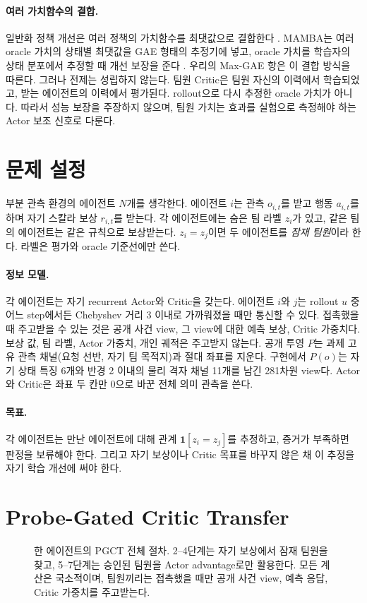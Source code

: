 \documentclass[10pt,twocolumn,letterpaper]{article}
\begin{document}
\paragraph{여러 가치함수의 결합.}
일반화 정책 개선은 여러 정책의 가치함수를 최댓값으로 결합한다 \citep{gpi}. MAMBA는 여러 oracle 가치의 상태별 최댓값을 GAE 형태의 추정기에 넣고, oracle 가치를 학습자의 상태 분포에서 추정할 때 개선 보장을 준다 \citep{mamba}. 우리의 Max-GAE 항은 이 결합 방식을 따른다. 그러나 전제는 성립하지 않는다. 팀원 Critic은 팀원 자신의 이력에서 학습되었고, 받는 에이전트의 이력에서 평가된다. rollout으로 다시 추정한 oracle 가치가 아니다. 따라서 성능 보장을 주장하지 않으며, 팀원 가치는 효과를 실험으로 측정해야 하는 Actor 보조 신호로 다룬다.

\section{문제 설정}
부분 관측 환경의 에이전트 $N$개를 생각한다. 에이전트 $i$는 관측 $o_{i,t}$를 받고 행동 $a_{i,t}$를 하며 자기 스칼라 보상 $r_{i,t}$를 받는다. 각 에이전트에는 숨은 팀 라벨 $z_i$가 있고, 같은 팀의 에이전트는 같은 규칙으로 보상받는다. $z_i=z_j$이면 두 에이전트를 \emph{잠재 팀원}이라 한다. 라벨은 평가와 oracle 기준선에만 쓴다.

\paragraph{정보 모델.}
각 에이전트는 자기 recurrent Actor와 Critic을 갖는다. 에이전트 $i$와 $j$는 rollout $u$ 중 어느 step에서든 Chebyshev 거리 3 이내로 가까워졌을 때만 통신할 수 있다.
\DonorEquation
접촉했을 때 주고받을 수 있는 것은 공개 사건 view, 그 view에 대한 예측 보상, Critic 가중치다. 보상 값, 팀 라벨, Actor 가중치, 개인 궤적은 주고받지 않는다. 공개 투영 $P$는 과제 고유 관측 채널(요청 선반, 자기 팀 목적지)과 절대 좌표를 지운다. 구현에서 $P(o)$는 자기 상태 특징 6개와 반경 2 이내의 물리 격자 채널 11개를 남긴 281차원 view다. Actor와 Critic은 좌표 두 칸만 0으로 바꾼 전체 의미 관측을 쓴다.

\paragraph{목표.}
각 에이전트는 만난 에이전트에 대해 관계 $\mathbf 1[z_i=z_j]$를 추정하고, 증거가 부족하면 판정을 보류해야 한다. 그리고 자기 보상이나 Critic 목표를 바꾸지 않은 채 이 추정을 자기 학습 개선에 써야 한다.

\section{Probe-Gated Critic Transfer}
\begin{figure}[t]
\centering\resizebox{.97\textwidth}{!}{}
\caption{한 에이전트의 PGCT 전체 절차. 2--4단계는 자기 보상에서 잠재 팀원을 찾고, 5--7단계는 승인된 팀원을 Actor advantage로만 활용한다. 모든 계산은 국소적이며, 팀원끼리는 접촉했을 때만 공개 사건 view, 예측 응답, Critic 가중치를 주고받는다.}\label{fig:architecture}
\end{figure}
\end{document}
